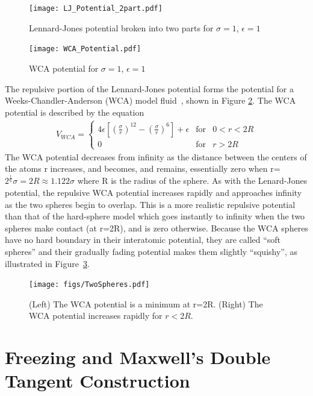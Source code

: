 \documentclass[double,12pt]{beavtex}
\begin{document}
\begin{figure}
    \centering
    \texttt{[image: LJ\_Potential\_2part.pdf]}
    \caption{Lennard-Jones potential broken into two parts for $\sigma=1$, $\epsilon=1$}
    \label{fig:LJ_potential_2parts}
  \end{figure}

\begin{figure}
    \centering
    \texttt{[image: WCA\_Potential.pdf]}
    \caption{WCA potential for $\sigma=1$, $\epsilon=1$}
    \label{fig:WCA_potential}
  \end{figure}

The repulsive portion of the Lennard-Jones potential forms the potential for a 
Weeks-Chandler-Anderson (WCA) model fluid~\cite{andersen1971relationship},
shown in Figure \ref{fig:WCA_potential}. 
The WCA potential is described by the equation 
\begin{align} \label{eq:VWCA}
    V_{WCA}=\left\{\begin{array}{rcl} {4\epsilon{\left[\left(\frac{\sigma}{r}\right)^{12} - \left(\frac{\sigma}{r}\right)^6 \right]}+\epsilon} & \mbox{for} & 0<r<{2R} \\ 0 & \mbox{for} & r>2R \end{array}\right.
\end{align} 
The WCA potential decreases from infinity as the distance between the 
centers of the atoms r increases, and becomes, and remains, essentially 
zero when r=$2^\frac{1}{6}\sigma=2R\approx{1.122}\sigma$ where R is the 
radius of the sphere. 
As with the Lenard-Jones potential, the repulsive WCA potential increases 
rapidly and approaches infinity as the two spheres begin to overlap. This 
is a more realistic repulsive potential than that of the hard-sphere model 
which goes instantly to infinity when the two spheres make contact (at r=2R), 
and is zero otherwise. Because the WCA spheres have no hard boundary in 
their interatomic potential, they are called ``soft spheres'' and their 
gradually fading potential makes them slightly ``squishy'', as illustrated in
Figure~\ref{fig:TwoSpheres}.

\begin{figure}
    \centering
    \texttt{[image: figs/TwoSpheres.pdf]} 
    \caption{(Left) The WCA potential is a minimum at r=2R. 
             (Right) The WCA potential increases rapidly for $r<2R$.}
    \label{fig:TwoSpheres}
\end{figure} 
    
\section{Freezing and Maxwell's Double Tangent Construction}
\end{document}
